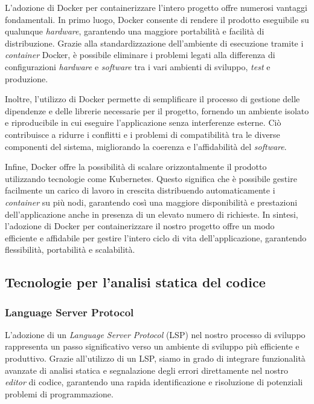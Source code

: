 L'adozione di Docker per containerizzare l'intero progetto offre numerosi
vantaggi fondamentali. In primo luogo, Docker consente di rendere il prodotto
eseguibile su qualunque \textit{hardware}, garantendo una maggiore portabilità e
facilità di distribuzione. Grazie alla standardizzazione dell'ambiente di
esecuzione tramite i \textit{container} Docker, è possibile eliminare i problemi legati
alla differenza di configurazioni \textit{hardware} e \textit{software} tra i
vari ambienti di sviluppo, \textit{test} e produzione.

Inoltre, l'utilizzo di Docker permette di semplificare il processo di gestione
delle dipendenze e delle librerie necessarie per il progetto, fornendo un
ambiente isolato e riproducibile in cui eseguire l'applicazione senza
interferenze esterne. Ciò contribuisce a ridurre i conflitti e i problemi di
compatibilità tra le diverse componenti del sistema, migliorando la coerenza e
l'affidabilità del \textit{software}.

Infine, Docker offre la possibilità di scalare orizzontalmente il prodotto
utilizzando tecnologie come Kubernetes. Questo significa che è possibile gestire
facilmente un carico di lavoro in crescita distribuendo automaticamente i
\textit{container} su più nodi, garantendo così una maggiore disponibilità e prestazioni
dell'applicazione anche in presenza di un elevato numero di richieste. In
sintesi, l'adozione di Docker per containerizzare il nostro progetto offre un
modo efficiente e affidabile per gestire l'intero ciclo di vita
dell'applicazione, garantendo flessibilità, portabilità e scalabilità.

\subsection{Tecnologie per l'analisi statica del codice}

\subsubsection{Language Server Protocol}

L'adozione di un \textit{Language Server Protocol} (LSP) nel nostro processo di sviluppo
rappresenta un passo significativo verso un ambiente di sviluppo più efficiente
e produttivo. Grazie all'utilizzo di un LSP, siamo in grado di integrare
funzionalità avanzate di analisi statica e segnalazione degli errori
direttamente nel nostro \textit{editor} di codice, garantendo una rapida
identificazione e risoluzione di potenziali problemi di programmazione.

